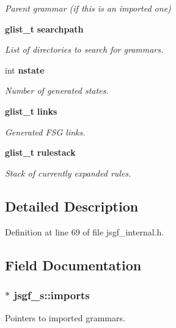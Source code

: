 \begin{DoxyCompactItemize}
\begin{DoxyCompactList}\small\item\em \-Parent grammar (if this is an imported one) \end{DoxyCompactList}\item 
{\bf glist\-\_\-t} {\bf searchpath}
\begin{DoxyCompactList}\small\item\em \-List of directories to search for grammars. \end{DoxyCompactList}\item 
int {\bf nstate}
\begin{DoxyCompactList}\small\item\em \-Number of generated states. \end{DoxyCompactList}\item 
{\bf glist\-\_\-t} {\bf links}
\begin{DoxyCompactList}\small\item\em \-Generated \-F\-S\-G links. \end{DoxyCompactList}\item 
{\bf glist\-\_\-t} {\bf rulestack}
\begin{DoxyCompactList}\small\item\em \-Stack of currently expanded rules. \end{DoxyCompactList}\end{DoxyCompactItemize}


\subsection{\-Detailed \-Description}


\-Definition at line 69 of file jsgf\-\_\-internal.\-h.



\subsection{\-Field \-Documentation}
\subsubsection[{imports}]{$\ast$ {\bf jsgf\-\_\-s\-::imports}}\label{structjsgf__s_a7efd071684d4ef7f077b0b06ce7bbc78}


\-Pointers to imported grammars. 



